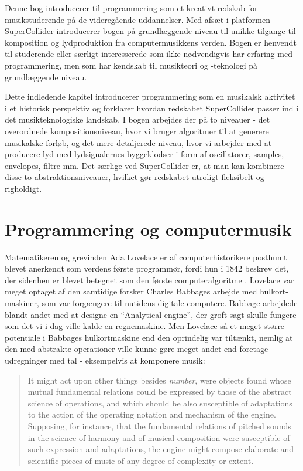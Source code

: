 

Denne bog introducerer til programmering som et kreativt redskab for musikstuderende på de videregående uddannelser. Med afsæt i platformen SuperCollider introducerer bogen på grundlæggende niveau til unikke tilgange til komposition og lydproduktion fra computermusikkens verden. Bogen er henvendt til studerende eller særligt interesserede som ikke nødvendigvis har erfaring med programmering, men som har kendskab til musikteori og -teknologi på grundlæggende niveau.

Dette indledende kapitel introducerer programmering som en musikalsk aktivitet i et historisk perspektiv og forklarer hvordan redskabet SuperCollider passer ind i det musikteknologiske landskab. I bogen arbejdes der på to niveauer - det overordnede kompositionsniveau, hvor vi bruger algoritmer til at generere musikalske forløb, og det mere detaljerede niveau, hvor vi arbejder med at producere lyd med lydsignalernes byggeklodser i form af oscillatorer, samples, envelopes, filtre mm. Det særlige ved SuperCollider er, at man kan kombinere disse to abstraktionsniveauer, hvilket gør redskabet utroligt fleksibelt og righoldigt.
\section{Programmering og computermusik}

Matematikeren og grevinden Ada Lovelace er af computerhistorikere posthumt blevet anerkendt som verdens første programmør, fordi hun i 1842 beskrev det, der sidenhen er blevet betegnet som den første computeralgoritme \parencite{gregersen2015}. Lovelace var meget optaget af den samtidige forsker Charles Babbages arbejde med hulkort-maskiner, som var forgængere til nutidens digitale computere. Babbage arbejdede blandt andet med at designe en \enquote{Analytical engine}, der groft sagt skulle fungere som det vi i dag ville kalde en regnemaskine. Men Lovelace så et meget større potentiale i Babbages hulkortmaskine end den oprindelig var tiltænkt, nemlig at den med abstrakte operationer ville kunne gøre meget andet end foretage udregninger med tal - eksempelvis at komponere musik:

\begin{quotation}
  It might act upon other things besides \textit{number}, were objects found whose mutual fundamental relations could be expressed by those of the abstract science of operations, and which should be also susceptible of adaptations to the action of the operating notation and mechanism of the engine. Supposing, for instance, that the fundamental relations of pitched sounds in the science of harmony and of musical composition were susceptible of such expression and adaptations, the engine might compose elaborate and scientific pieces of music of any degree of complexity or extent. \parencite[p. 162]{lovelace2015}
\end{quotation}

